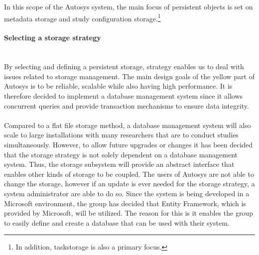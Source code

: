 In this scope of the Autosys system, the main focus of persistent objects is set on metadata storage and study configuration storage.\footnote{In addition, taskstorage is also a primary focus.}

\paragraph{Selecting a storage strategy}\mbox{}\\
By selecting and defining a persistent storage, strategy enables us to deal with issues related to storage management. The main design goals of the yellow part of Autosys is to be reliable, scalable while also having high performance. It is therefore decided to implement a database management system since it allows concurrent queries and provide transaction mechanisms to ensure data integrity. \\\\Compared to a flat file storage method, a database management system will also scale to large installations with many researchers that are to conduct studies simultaneously. However, to allow future upgrades or changes it has been decided that the storage strategy is not solely dependent on a database management system. Thus, the storage subsystem will provide an abstract interface that enables other kinds of storage to be coupled. The users of Autosys are not able to change the storage, however if an update is ever needed for the storage strategy, a system administrator are able to do so. Since the system is being developed in a Microsoft environment, the group has decided that Entity Framework, which is provided by Microsoft, will be utilized. The reason for this is it enables the group to easily define and create a database that can be used with their system.